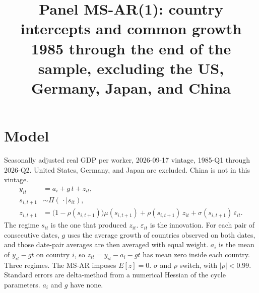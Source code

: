 \documentclass[11pt]{article}
\title{Panel MS-AR(1): country intercepts and common growth\\[0.4em]\large 1985 through the end of the sample, excluding the US, Germany, Japan, and China}
\author{}
\date{}
\begin{document}
\maketitle
\section{Model}
Seasonally adjusted real GDP per worker, 2026-09-17 vintage, 1985-Q1 through 2026-Q2. United States, Germany, and Japan are excluded. China is not in this vintage.
\begin{align}
y_{it} &= a_i + g\, t + z_{it}, \\
s_{i,t+1} &\sim \Pi(\,\cdot\mid s_{it}), \\
z_{i,t+1} &= \bigl(1-\rho(s_{i,t+1})\bigr)\mu(s_{i,t+1}) + \rho(s_{i,t+1})\, z_{it} + \sigma(s_{i,t+1})\,\varepsilon_{it}.
\end{align}
The regime $s_{it}$ is the one that produced $z_{it}$. $\varepsilon_{it}$ is the innovation. For each pair of consecutive dates, $g$ uses the average growth of countries observed on both dates, and those date-pair averages are then averaged with equal weight. $a_i$ is the mean of $y_{it}-gt$ on country $i$, so $z_{it}=y_{it}-a_i-gt$ has mean zero inside each country. Three regimes. The MS-AR imposes $E[z]=0$. $\sigma$ and $\rho$ switch, with $|\rho|<0.99$. Standard errors are delta-method from a numerical Hessian of the cycle parameters. $a_i$ and $g$ have none.
\clearpage
\end{document}
